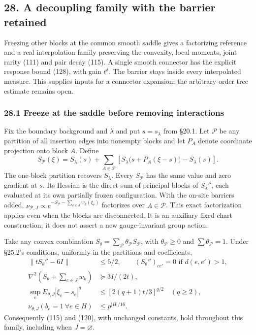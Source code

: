 \documentclass[11pt,a4paper]{article}
\begin{document}
\hypertarget{a-decoupling-family-with-the-barrier-retained}{%
\subsection{28. A decoupling family with the barrier
retained}\label{a-decoupling-family-with-the-barrier-retained}}

Freezing other blocks at the common smooth saddle gives a factorizing
reference and a real interpolation family preserving the convexity,
local moments, joint rarity (111) and pair decay (115). A single smooth
connector has the explicit response bound (128), with gain \(t^\delta\).
The barrier stays inside every interpolated measure. This supplies
inputs for a connector expansion; the arbitrary-order tree estimate
remains open.

\hypertarget{freeze-at-the-saddle-before-removing-interactions}{%
\subsubsection{28.1 Freeze at the saddle before removing
interactions}\label{freeze-at-the-saddle-before-removing-interactions}}

Fix the boundary background and \(\lambda\) and put \(s=s_\lambda\) from
§20.1. Let \(\mathcal P\) be any partition of all insertion edges into
nonempty blocks and let \(P_A\) denote coordinate projection onto block
\(A\). Define \[S_{\mathcal P}(\xi)
=S_\lambda(s)+\sum_{A\in\mathcal P}
 \left[S_\lambda\bigl(s+P_A(\xi-s)\bigr)-S_\lambda(s)\right].
\tag{124}\] The one-block partition recovers \(S_\lambda\). Every
\(S_{\mathcal P}\) has the same value and zero gradient at \(s\). Its
Hessian is the direct sum of principal blocks of \(S_\lambda''\), each
evaluated at its own partially frozen configuration. With the on-site
barriers added,
\(\nu_{\mathcal P,J}\propto e^{-S_{\mathcal P}-\sum_{e\in J}w_k(\xi_e)}\)
factorizes over \(A\in\mathcal P\). This exact factorization applies
even when the blocks are disconnected. It is an auxiliary fixed-chart
construction; it does not assert a new gauge-invariant group action.

Take any convex combination
\(S_\theta=\sum_{\mathcal P} \theta_{\mathcal P}S_{\mathcal P}\), with
\(\theta_{\mathcal P}\ge0\) and \(\sum\theta_{\mathcal P}=1\). Under
§25.2's conditions, uniformly in the partitions and coefficients,
\[\begin{aligned}
\|tS_\theta''-6I\|&\le5/2,\qquad
(S_\theta'')_{ee'}=0\text{ if }d(e,e')>1,\\
\nabla^2\left(S_\theta+\sum_{e\in J}w_k\right)&\succeq3I/(2t),\\
\sup_e E_{\theta,J}|\xi_e-s_e|^q
 &\le[2(q+1)t/3]^{q/2}\quad(q\ge2),\\
\nu_{\theta,J}(b_e=1\ \forall e\in H)&\le p^{|H|/16}.
\end{aligned}\tag{125}\] Consequently (115) and (120), with unchanged
constants, hold throughout this family, including when
\(J=\varnothing\).
\end{document}
